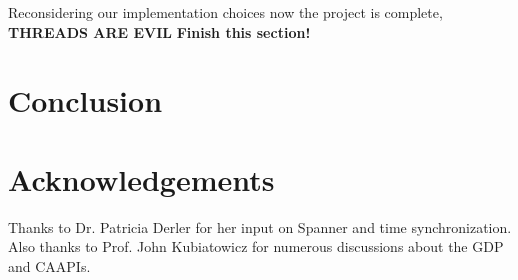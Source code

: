 \documentclass[10pt,twocolumn]{article}
\begin{document}
Reconsidering our implementation choices now the project is complete, 
\textbf{THREADS ARE EVIL}
\textbf{Finish this section!}

\section{Conclusion}



\section{Acknowledgements}
Thanks to Dr. Patricia Derler for her input on Spanner and time synchronization. Also thanks to Prof. John Kubiatowicz for numerous discussions about the GDP and CAAPIs.



\end{document}
